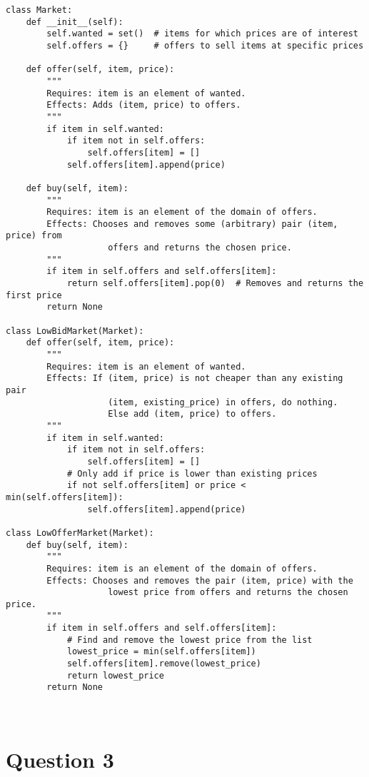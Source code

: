 \documentclass[11pt]{article}
\begin{document}
\begin{lstlisting}
class Market:
    def __init__(self):
        self.wanted = set()  # items for which prices are of interest
        self.offers = {}     # offers to sell items at specific prices

    def offer(self, item, price):
        """
        Requires: item is an element of wanted.
        Effects: Adds (item, price) to offers.
        """
        if item in self.wanted:
            if item not in self.offers:
                self.offers[item] = []
            self.offers[item].append(price)

    def buy(self, item):
        """
        Requires: item is an element of the domain of offers.
        Effects: Chooses and removes some (arbitrary) pair (item, price) from
                    offers and returns the chosen price.
        """
        if item in self.offers and self.offers[item]:
            return self.offers[item].pop(0)  # Removes and returns the first price
        return None

class LowBidMarket(Market):
    def offer(self, item, price):
        """
        Requires: item is an element of wanted.
        Effects: If (item, price) is not cheaper than any existing pair
                    (item, existing_price) in offers, do nothing.
                    Else add (item, price) to offers.
        """
        if item in self.wanted:
            if item not in self.offers:
                self.offers[item] = []
            # Only add if price is lower than existing prices
            if not self.offers[item] or price < min(self.offers[item]):
                self.offers[item].append(price)

class LowOfferMarket(Market):
    def buy(self, item):
        """
        Requires: item is an element of the domain of offers.
        Effects: Chooses and removes the pair (item, price) with the 
                    lowest price from offers and returns the chosen price.
        """
        if item in self.offers and self.offers[item]:
            # Find and remove the lowest price from the list
            lowest_price = min(self.offers[item])
            self.offers[item].remove(lowest_price)
            return lowest_price
        return None                
\end{lstlisting}

\newpage
\
\newpage
\section{Question 3}
\end{document}
